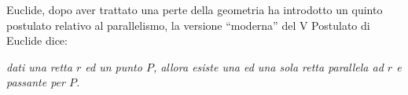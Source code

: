 \begin{comment}
 

Assumendo dunque questa come definizione di parallelismo, abbiamo 
bisogno di precisare il concetto di distanza.
Dati due punti \(P\) e \(Q\), la \emph{distanza} tra \(P\) e \(Q\) è la 
lunghezza del \emph{percorso più breve} che unisce i due punti. 
Questo concetto è valido anche se si riferisce alle distanze tra due 
città che si trovano negli stradari: sono riportate le lunghezze dei 
percorsi minimi tra tutte le strade alternative che collegano due 
città. Naturalmente, nel piano, ove si ``dispone'' di tutti i punti 
da poter ``attraversare'', il percorso più breve che collega due 
punti \(P\) e \(Q\) è il segmento \(PQ\); quindi nella geometria euclidea 
assumiamo come distanza tra due punti la lunghezza del segmento 
avente per estremi i due punti.

Se vogliamo parlare di distanza tra due insiemi di punti, allora va 
considerato il percorso più breve tra tutti i percorsi che collegano 
un qualsiasi punto del primo insieme con un qualsiasi punto del 
secondo: in pratica la distanza è la lunghezza del più piccolo 
segmento tra tutti quelli che collegano i due insiemi di punti. 

Nel caso particolare di un punto \(A\) ed una retta \(BC\), se il punto 
appartiene alla retta allora la distanza di \(A\) da \(BC\) è uguale a 
zero, altrimenti si considera come distanza la lunghezza del segmento 
\(AH\), dove \(H\) è il punto in cui la perpendicolare a \(BC\) passante 
per \(A\) interseca la stessa retta \(BC\): il motivo si intuisce in base 
a quanto detto, ma risulterà chiaro più avanti, quando affronteremo 
lo studio delle disuguaglianze tra gli elementi di un triangolo. 

Analogamente, come distanza tra due rette parallele si assume la 
lunghezza di un qualunque segmento che unisce il punto di una delle 
due rette con il piede della perpendicolare mandata da esso 
sull'altra retta. Affermare che tali segmenti sono tutti congruenti è 
un modo più preciso per dire che le due rette mantengono sempre la 
stessa distanza.
\end{comment}

Euclide, dopo aver trattato una perte della geometria ha introdotto un 
quinto postulato relativo al parallelismo, la versione 
``moderna'' del V Postulato di Euclide dice: 

\begin{postulato}
\emph{dati una retta \(r\) ed un punto \(P\), allora esiste una ed una 
  sola retta parallela ad \(r\) e passante per \(P\).}
\end{postulato}

